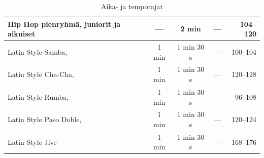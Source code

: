 \documentclass[12pt, a4paper, oneside]{article}
\begin{document}
\begin{table}[ht]
\begin{tabular}{@{\hspace{0.25cm}}lcccr@{\hspace{0.25cm}}}
        Hip Hop pienryhmä, juniorit ja aikuiset & ---                 & 2 min                  & ---                    & 104--120       \\ \midrule
        Latin Style Samba,                      & 1 min               & 1 min 30 s             & ---                    & 100--104       \\
        Latin Style Cha-Cha,                    & 1 min               & 1 min 30 s             & ---                    & 120--128       \\
        Latin Style Rumba,                      & 1 min               & 1 min 30 s             & ---                    &  96--108       \\
        Latin Style Paso Doble,                 & 1 min               & 1 min 30 s             & ---                    & 120--124       \\
        Latin Style Jive                        & 1 min               & 1 min 30 s             & ---                    & 168--176       \\ \bottomrule
    \end{tabular}
    \caption{Aika- ja temporajat}
    \label{tab:bpm-rajat}
\end{table}

\end{document}
